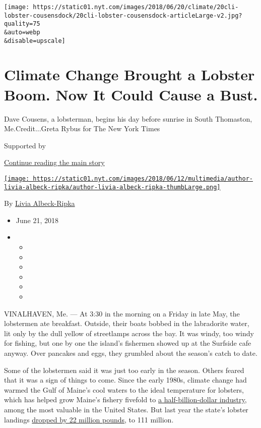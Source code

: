 \texttt{[image: https://static01.nyt.com/images/2018/06/20/climate/20cli-lobster-cousensdock/20cli-lobster-cousensdock-articleLarge-v2.jpg?quality=75\\\&auto=webp\\\&disable=upscale]}

\hypertarget{climate-change-brought-a-lobster-boom-now-it-could-cause-a-bust}{%
\section{Climate Change Brought a Lobster Boom. Now It Could Cause a
Bust.}\label{climate-change-brought-a-lobster-boom-now-it-could-cause-a-bust}}

Dave Cousens, a lobsterman, begins his day before sunrise in South
Thomaston, Me.Credit...Greta Rybus for The New York Times

Supported by

\protect\hyperlink{after-sponsor}{Continue reading the main story}

\href{https://www.nytimes.com/by/livia-albeck-ripka}{\texttt{[image: https://static01.nyt.com/images/2018/06/12/multimedia/author-livia-albeck-ripka/author-livia-albeck-ripka-thumbLarge.png]}}

By \href{https://www.nytimes.com/by/livia-albeck-ripka}{Livia
Albeck-Ripka}

\begin{itemize}
\item
  June 21, 2018
\item
  \begin{itemize}
  \item
  \item
  \item
  \item
  \item
  \item
  \end{itemize}
\end{itemize}

VINALHAVEN, Me. --- At 3:30 in the morning on a Friday in late May, the
lobstermen ate breakfast. Outside, their boats bobbed in the labradorite
water, lit only by the dull yellow of streetlamps across the bay. It was
windy, too windy for fishing, but one by one the island's fishermen
showed up at the Surfside cafe anyway. Over pancakes and eggs, they
grumbled about the season's catch to date.

Some of the lobstermen said it was just too early in the season. Others
feared that it was a sign of things to come. Since the early 1980s,
climate change had warmed the Gulf of Maine's cool waters to the ideal
temperature for lobsters, which has helped grow Maine's fishery fivefold
to
\href{https://www.maine.gov/dmr/commercial-fishing/landings/documents/2017ValueBySpecies.Pie.Graph.pdf}{a
half-billion-dollar industry}, among the most valuable in the United
States. But last year the state's lobster landings
\href{http://www.maine.gov/dmr/commercial-fishing/landings/documents/lobster.table.pdf}{dropped
by 22 million pounds}, to 111 million.

